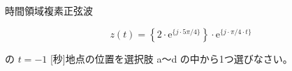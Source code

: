 時間領域複素正弦波

\[
z(t) =  \left \{ 2 \cdot \textrm{e}^{\{j \cdot 5\pi/4 \}} \right \} \cdot \textrm{e}^{\{ j \cdot \pi/4 \cdot t \}}
\]

\bigskip
\noindent の $t = -1$ [秒]地点の位置を選択肢 a〜d の中から1つ選びなさい。
